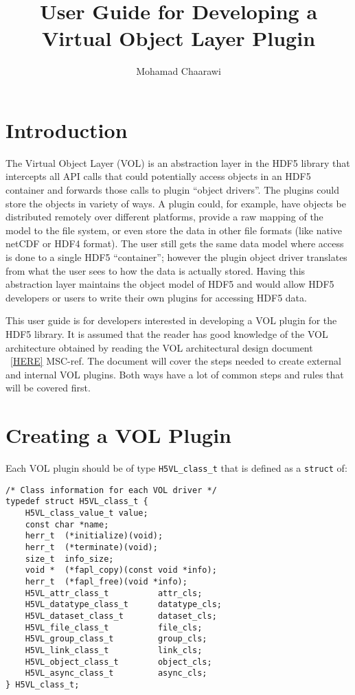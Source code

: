 \documentclass[10pt,a4paper]{article}
\title{User Guide for Developing a Virtual Object Layer Plugin}
\author{Mohamad Chaarawi}
\begin{document}
\maketitle

\newpage
{}
\tableofcontents
\newpage


\section{Introduction}
The Virtual Object Layer (VOL) is an abstraction layer in the HDF5
library that intercepts all API calls that could potentially access
objects in an HDF5 container and forwards those calls to plugin
``object drivers''. The plugins could store the objects in variety of
ways. A plugin could, for example, have objects be distributed
remotely over different platforms, provide a raw mapping of the model
to the file system, or even store the data in other file formats (like
native netCDF or HDF4 format). The user still gets the same data model
where access is done to a single HDF5 “container”; however the plugin
object driver translates from what the user sees to how the data is
actually stored. Having this abstraction layer maintains the object
model of HDF5 and would allow HDF5 developers or users to write their
own plugins for accessing HDF5 data.

This user guide is for developers interested in developing a VOL plugin
for the HDF5 library. It is assumed that the reader has good knowledge
of the VOL architecture obtained by reading the VOL architectural
design document ~\ref{HERE} MSC-ref. The document will cover the steps
needed to create external and internal VOL plugins. Both ways have a
lot of common steps and rules that will be covered first.

\section{Creating a VOL Plugin}
Each VOL plugin should be of type {\tt H5VL\_class\_t} that is defined
as a {\tt struct} of:

\begin{lstlisting}
/* Class information for each VOL driver */
typedef struct H5VL_class_t {
    H5VL_class_value_t value;
    const char *name;
    herr_t  (*initialize)(void);
    herr_t  (*terminate)(void);
    size_t  info_size;
    void *  (*fapl_copy)(const void *info);
    herr_t  (*fapl_free)(void *info);
    H5VL_attr_class_t          attr_cls;
    H5VL_datatype_class_t      datatype_cls;
    H5VL_dataset_class_t       dataset_cls;
    H5VL_file_class_t          file_cls;
    H5VL_group_class_t         group_cls;
    H5VL_link_class_t          link_cls;
    H5VL_object_class_t        object_cls;
    H5VL_async_class_t         async_cls;
} H5VL_class_t;
\end{lstlisting}
\end{document}
